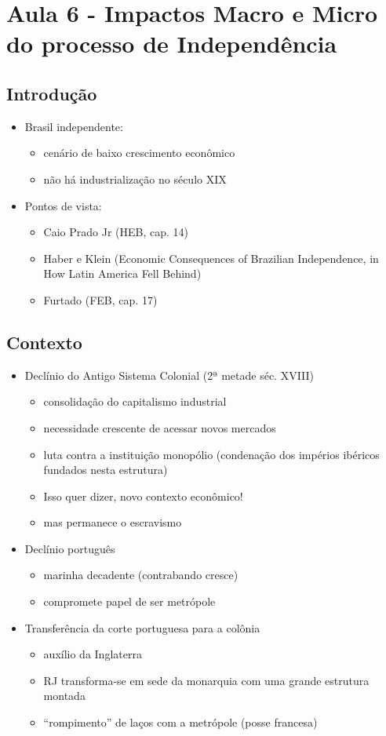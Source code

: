 \documentclass[a4paper,12pt]{article}[abntex2]
\begin{document}
\section{\textbf{Aula 6 - Impactos Macro e Micro do processo de Independência}}

\subsection{\textbf{Introdução}}
\begin{itemize}
    \item Brasil independente:
    \begin{itemize}
        \item cenário de baixo crescimento econômico
        \item não há industrialização no século XIX
    \end{itemize}
    \item Pontos de vista: 
    \begin{itemize}
        \item Caio Prado Jr (HEB, cap. 14)
        \item Haber e Klein (Economic Consequences of Brazilian Independence, in How Latin America Fell Behind)
        \item Furtado (FEB, cap. 17)
    \end{itemize}
\end{itemize}
\subsection{\textbf{Contexto}}
\begin{itemize}
    \item Declínio do Antigo Sistema Colonial (2ª metade séc. XVIII) 
    \begin{itemize}
        \item consolidação do capitalismo industrial
        \item necessidade crescente de acessar novos mercados
        \item luta contra a instituição monopólio (condenação dos
impérios ibéricos fundados nesta estrutura)
\item Isso quer dizer, novo contexto econômico!
\item mas permanece o escravismo
    \end{itemize}
    \item Declínio português 
    \begin{itemize}
        \item marinha decadente (contrabando cresce)
        \item compromete papel de ser metrópole 
    \end{itemize}
\item  Transferência da corte portuguesa para a colônia 
\begin{itemize}
    \item auxílio da Inglaterra
    \item RJ transforma-se em sede da monarquia com uma grande estrutura montada 
    \item “rompimento” de laços com a metrópole (posse francesa)
\end{itemize}
\end{itemize}
\end{document}
